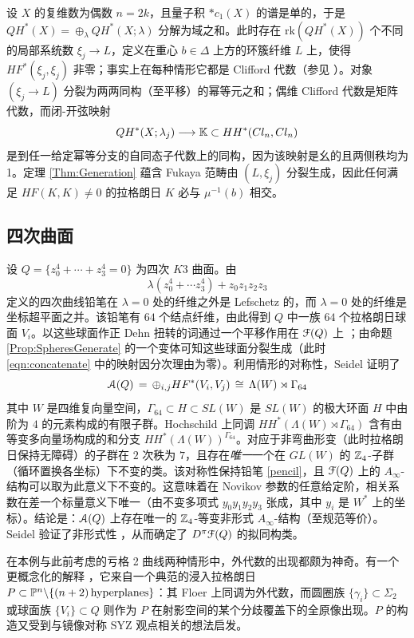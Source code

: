 设 $X$ 的复维数为偶数 $n=2k$，且量子积 $\ast c_1(X)$ 的谱是单的，于是 $QH^*(X) = \oplus_{\lambda} QH^*(X;\lambda)$ 分解为域之和。此时存在 $\mathrm{rk}(QH^*(X))$ 个不同的局部系统数 $\xi_j \rightarrow L$，定义在重心 $b\in\Delta$ 上方的环簇纤维 $L$ 上，使得 $HF^*(\xi_j, \xi_j)$ 非零；事实上在每种情形它都是 Clifford 代数（参见 \cite{Cho-Oh, FO3:toric, RitterSmith}）。对象 $(\xi_j \rightarrow L)$ 分裂为两两同构（至平移）的幂等元之和；偶维 Clifford 代数是矩阵代数，而闭-开弦映射
\[
QH^*(X;\lambda_j) \longrightarrow \mathbb{K} \subset HH^*(Cl_n, Cl_n) 
\]
是到任一给定幂等分支的自同态子代数上的同构，因为该映射是幺的且两侧秩均为 1。定理 \ref{Thm:Generation} 蕴含 Fukaya 范畴由 $(L,\xi_j)$ 分裂生成，因此任何满足 $HF(K,K)\neq 0$ 的拉格朗日 $K$ 必与 $\mu^{-1}(b)$ 相交。

\subsection{四次曲面\label{Sec:K3}} 设 $Q= \{z_0^4+\cdots + z_3^4 = 0\}$ 为四次 $K3$ 曲面。由
\begin{equation}\label{pencil}
\lambda(z_0^4+ \cdots z_3^4) + z_0z_1z_2z_3
\end{equation}
定义的四次曲线铅笔在 $\lambda = 0$ 处的纤维之外是 Lefschetz 的，而 $\lambda = 0$ 处的纤维是坐标超平面之并。该铅笔有 $64$ 个结点纤维，由此得到 $Q$ 中一族 $64$ 个拉格朗日球面 $V_i$。以这些球面作正 Dehn 扭转的词通过一个平移作用在 $\EuScript{F}(Q)$ 上 \cite{Seidel:HMSquartic}；由命题 \ref{Prop:SpheresGenerate} 的一个变体可知这些球面分裂生成（此时 \eqref{eqn:concatenate} 中的映射因分次理由为零）。利用情形的对称性，Seidel 证明了
\[
\EuScript{A}(Q) \, = \, \oplus_{i,j} HF^*(V_i, V_j) \, \cong \, \Lambda(W) \rtimes \Gamma_{64}
\]
其中 $W$ 是四维复向量空间，$\Gamma_{64} \subset H \subset SL(W)$ 是 $SL(W)$ 的极大环面 $H$ 中由阶为 $4$ 的元素构成的有限子群。Hochschild 上同调 $HH^*(\Lambda(W)\rtimes \Gamma_{64})$ 含有由等变多向量场构成的和分支 $HH^*(\Lambda(W))^{\Gamma_{64}}$。对应于非弯曲形变（此时拉格朗日保持无障碍）的子群在 $2$ 次秩为 $7$，且存在\emph{唯一}一个在 $GL(W)$ 的 $\mathbb{Z}_4$-子群（循环置换各坐标）下不变的类。该对称性保持铅笔 \eqref{pencil}，且 $\EuScript{F}(Q)$ 上的 $A_{\infty}$-结构可以取为此意义下不变的。这意味着在 Novikov 参数的任意给定阶，相关系数在差一个标量意义下唯一（由不变多项式 $y_0y_1y_2y_3$ 张成，其中 $y_i$ 是 $W^*$ 上的坐标）。结论是：$\EuScript{A}(Q)$ 上存在唯一的 $\mathbb{Z}_4$-等变非形式 $A_{\infty}$-结构（至规范等价）。Seidel 验证了非形式性 \cite{Seidel:HMSquartic}，从而确定了 $D^{\pi}\EuScript{F}(Q)$ 的拟同构类。

在本例与此前考虑的亏格 2 曲线两种情形中，外代数的出现都颇为神奇。有一个更概念化的解释 \cite{Seidel:HMSgenus2, Sheridan}，它来自一个典范的浸入拉格朗日 $P \subset \mathbb{P}^n\backslash \{(n+2) \, \mathrm{hyperplanes}\}$：其 Floer 上同调为外代数，而圆圈族 $\{\gamma_i\} \subset \Sigma_2$ 或球面族 $\{V_i\} \subset Q$ 则作为 $P$ 在射影空间的某个分歧覆盖下的全原像出现。$P$ 的构造又受到与镜像对称 SYZ 观点相关的想法启发。

